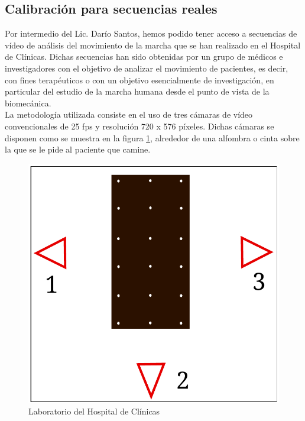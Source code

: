 
\subsection{Calibración para secuencias reales}

\label{seccion_calibracion_secuencias_reales}


Por intermedio del Lic. Darío Santos, hemos podido tener acceso a secuencias de vídeo de análisis del movimiento de la marcha que se han realizado en el Hospital de Clínicas. Dichas secuencias han sido obtenidas por un grupo de médicos e investigadores con el objetivo de analizar el movimiento de pacientes, es decir, con fines terapéuticos o con un objetivo esencialmente de investigación, en particular del estudio de la marcha humana desde el punto de vista de la biomecánica.\\


La metodología utilizada consiste en el uso de tres cámaras de vídeo convencionales de 25 fps y resolución  720 x 576 píxeles. Dichas cámaras se disponen como se muestra en la figura \ref{fig: lab_real}, alrededor de una alfombra o cinta sobre la que se le pide al paciente que camine.


\begin{figure}[ht]
\begin{center}
\includegraphics[scale=0.5]{img/calibracion/lab_real.pdf}
\end{center}
\caption{Laboratorio del Hospital de Clínicas}
\label{fig: lab_real}
\end{figure}

